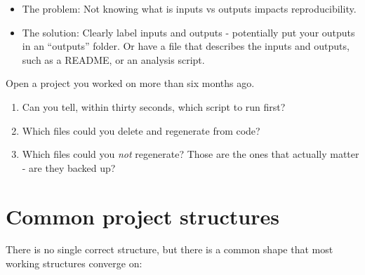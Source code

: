 \documentclass[
  letterpaper,
  justified,
  a4paper]{tufte-book}
\providecommand{\tightlist}{%
  \setlength{\itemsep}{0pt}\setlength{\parskip}{0pt}}
\providecommand{\tightlist}{%
  \setlength{\itemsep}{0pt}\setlength{\parskip}{0pt}}
\begin{document}
\begin{itemize}
\tightlist
\item
  The problem: Not knowing what is inputs vs outputs impacts
  reproducibility.
\item
  The solution: Clearly label inputs and outputs - potentially put your
  outputs in an ``outputs'' folder. Or have a file that describes the
  inputs and outputs, such as a README, or an analysis script.
\end{itemize}

\begin{tcolorbox}[enhanced jigsaw, arc=.35mm, bottomrule=.15mm, bottomtitle=1mm, breakable, colback=white, colbacktitle=quarto-callout-note-color!10!white, colframe=quarto-callout-note-color-frame, coltitle=black, left=2mm, leftrule=.75mm, opacityback=0, opacitybacktitle=0.6, rightrule=.15mm, title=\textcolor{quarto-callout-note-color}{\faInfo}\hspace{0.5em}{Your Turn}, titlerule=0mm, toprule=.15mm, toptitle=1mm]

Open a project you worked on more than six months ago.

\begin{enumerate}
\def\labelenumi{\arabic{enumi}.}
\tightlist
\item
  Can you tell, within thirty seconds, which script to run first?
\item
  Which files could you delete and regenerate from code?
\item
  Which files could you \emph{not} regenerate? Those are the ones that
  actually matter - are they backed up?
\end{enumerate}

\end{tcolorbox}


\chapter{Common project structures}\label{common-project-structures}

There is no single correct structure, but there is a common shape that
most working structures converge on:
\end{document}
